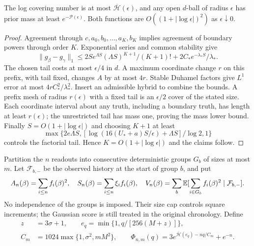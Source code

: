 \begin{lemma}
\label{lem:entropy}
The log covering number is at most $\overline{\mathcal H}(\epsilon)$, and
any open $d$-ball of radius $\epsilon$ has prior mass at least
$e^{-\mathcal P(\epsilon)}$. Both functions are
$O((1+|\log\epsilon|)^2)$ as $\epsilon\downarrow0$.
\end{lemma}
\begin{proof}
Agreement through $c,a_0,b_0,\ldots,a_K,b_K$ implies agreement of boundary
powers through order $K$. Exponential series and common stability give
\[
 \|g_\beta-g_\gamma\|_1\le2S e^{\Lambda S}
    (\Lambda S)^{K+1}/(K+1)!+2C_*e^{-\lambda_*S}/\lambda_*.
\]
The chosen tail costs at most $\epsilon/4$ in $d$. A maximum coordinate
change $r$ on this prefix, with tail fixed, changes $A$ by at most $4r$.
Stable Duhamel factors give $L^1$ error at most $4rC_*^2/\lambda_*^2$.
Insert an admissible hybrid to combine the bounds. A prefix mesh of radius
$r(\epsilon)$ with a fixed tail is an $\epsilon/2$ cover of the stated size.
Each coordinate interval about any truth, including a boundary truth, has
length at least $r(\epsilon)$; the unrestricted tail has mass one, proving
the mass lower bound. Finally $S=O(1+|\log\epsilon|)$ and choosing $K+1$ at least
\[
 \max\{2e\Lambda S,
  [\log(16(U_*+a)S/\epsilon)+\Lambda S]/\log2,1\}
\]
controls the factorial tail. Hence $K=O(1+|\log\epsilon|)$ and the claims follow.
\end{proof}

Partition the $n$ readouts into consecutive deterministic groups $G_b$ of sizes
at most $m$. Let $\mathcal F_{b,-}$ be the observed history at the start of group
$b$, and put
\[
 A_n(\beta)=\sum_{i\le n}f_i(\beta)^2,\quad
 S_n(\beta)=\sum_{i\le n}\xi_i f_i(\beta),\quad
 V_n(\beta)=\sum_b\mathbb E[\sum_{i\in G_b}f_i(\beta)^2\mid\mathcal F_{b,-}].
\]
No independence of the groups is imposed. Their size cap controls square
increments; the Gaussian score is still treated in the original chronology.
Define
\begin{equation}
 \begin{split}
 z&=3\sigma+1,\qquad e_q=\min\{1,q/[256(M+z)]\},\\
 C_m&=1024\max\{1,\sigma^2,mM^2\},\qquad
 \Phi_{n,m}(q)=3e^{\overline{\mathcal H}(e_q)-nq/C_m}+e^{-n}.
 \end{split}
 \label{eq:variance-tail}
\end{equation}

